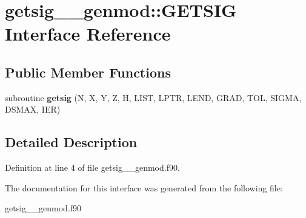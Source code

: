 \hypertarget{interfacegetsig____genmod_1_1_g_e_t_s_i_g}{\section{getsig\+\_\+\+\_\+genmod\+:\+:G\+E\+T\+S\+I\+G Interface Reference}
\label{interfacegetsig____genmod_1_1_g_e_t_s_i_g}
}
\subsection*{Public Member Functions}
\begin{DoxyCompactItemize}
\item 
\hypertarget{interfacegetsig____genmod_1_1_g_e_t_s_i_g_a2b209781fb5b8c9191537cab37a396b4}{subroutine {\bfseries getsig} (N, X, Y, Z, H, L\+I\+S\+T, L\+P\+T\+R, L\+E\+N\+D, G\+R\+A\+D, T\+O\+L, S\+I\+G\+M\+A, D\+S\+M\+A\+X, I\+E\+R)}\label{interfacegetsig____genmod_1_1_g_e_t_s_i_g_a2b209781fb5b8c9191537cab37a396b4}

\end{DoxyCompactItemize}


\subsection{Detailed Description}


Definition at line 4 of file getsig\+\_\+\+\_\+genmod.\+f90.



The documentation for this interface was generated from the following file\+:\begin{DoxyCompactItemize}
\item 
getsig\+\_\+\+\_\+genmod.\+f90\end{DoxyCompactItemize}
